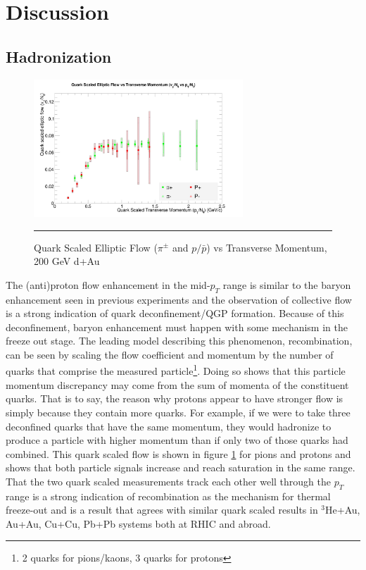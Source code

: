 \section{Discussion}

\subsection{Hadronization}
\begin{figure}[hbtp]
\centering    
    \includegraphics[width=0.7\textwidth]{results/v2NqvspT.jpg}
    \rule{35em}{0.5pt}
    \caption[Quark Scaled Elliptic Flow ($\pi^{\pm}$ and $p/\bar{p}$) vs Transverse Momentum, 200 GeV d+Au]{Quark Scaled Elliptic Flow ($\pi^{\pm}$ and $p/\bar{p}$) vs Transverse Momentum, 200 GeV d+Au}
    \label{fig:qscaledv2}
\end{figure}

The (anti)proton flow enhancement in the mid-$p_T$ range is similar to the baryon enhancement seen in previous experiments and the observation of collective flow is a strong indication of quark deconfinement/QGP formation. Because of this deconfinement, baryon enhancement must happen with some mechanism in the freeze out stage. The leading model describing this phenomenon, recombination, can be seen by scaling the flow coefficient and momentum by the number of quarks that comprise the measured particle\footnote{2 quarks for pions/kaons, 3 quarks for protons}. Doing so shows that this particle momentum discrepancy may come from the sum of momenta of the constituent quarks. That is to say, the reason why protons appear to have stronger flow is simply because they contain more quarks. For example, if we were to take three deconfined quarks that have the same momentum, they would hadronize to produce a particle with higher momentum than if only two of those quarks had combined. This quark scaled flow is shown in figure \ref{fig:qscaledv2} for pions and protons and shows that both particle signals increase and reach saturation in the same range. That the two quark scaled measurements track each other well through the $p_T$ range is a strong indication of recombination as the mechanism for thermal freeze-out and is a result that agrees with similar quark scaled results in $^3$He+Au\citep{huangQM2015}, Au+Au\citep{Adler:2003kt}, Cu+Cu\citep{PhysRevC.92.034913}, Pb+Pb\citep{Noferini:2012ps} systems both at RHIC and abroad.

